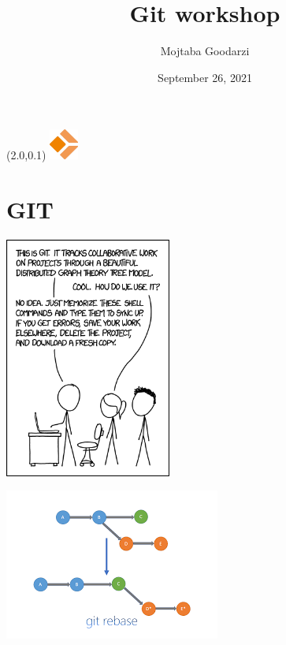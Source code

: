 \documentclass[11pt,xcolor={dvipsnames}]{beamer} %
\title[Git workshop]{Git workshop}
\author[Mojtaba Goodarzi]
{Mojtaba Goodarzi}
\institute[Sepehr]
{
  Sepehr
  }
\date{September 26, 2021}
\newcommand{\MyLogo}{%
\begin{textblock}{14}(2.0,0.1)
 \includegraphics[height=1cm, angle=0]{logo}
\end{textblock}
}
\begin{document}

\begin{frame}
\MyLogo
\begin{center}
  \titlepage
\end{center}
\end{frame}




\section{GIT}

\begin{frame}

\includegraphics[height=300px]{why-git.png}
\end{frame}

\begin{frame}
\includegraphics{rebase.png}
\end{frame}
\end{document}
